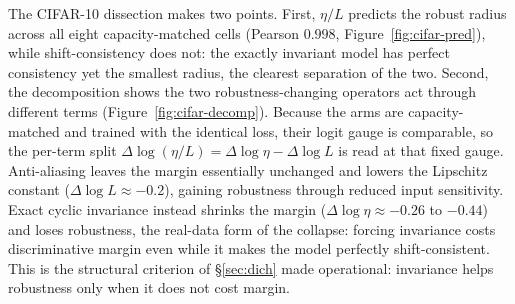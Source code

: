 \documentclass{article}
\theoremstyle{definition}
\begin{document}
The CIFAR-10 dissection makes two points. First, $\eta/L$ predicts the robust radius across all eight capacity-matched cells (Pearson $0.998$, Figure~\ref{fig:cifar-pred}), while shift-consistency does not: the exactly invariant model has perfect consistency yet the smallest radius, the clearest separation of the two. Second, the decomposition shows the two robustness-changing operators act through different terms (Figure~\ref{fig:cifar-decomp}). Because the arms are capacity-matched and trained with the identical loss, their logit gauge is comparable, so the per-term split $\Delta\log(\eta/L)=\Delta\log\eta-\Delta\log L$ is read at that fixed gauge. Anti-aliasing leaves the margin essentially unchanged and lowers the Lipschitz constant ($\Delta\log L\approx-0.2$), gaining robustness through reduced input sensitivity. Exact cyclic invariance instead shrinks the margin ($\Delta\log\eta\approx-0.26$ to $-0.44$) and loses robustness, the real-data form of the \citet{ge2021shift} collapse: forcing invariance costs discriminative margin even while it makes the model perfectly shift-consistent. This is the structural criterion of \S\ref{sec:dich} made operational: invariance helps robustness only when it does not cost margin.
\end{document}
